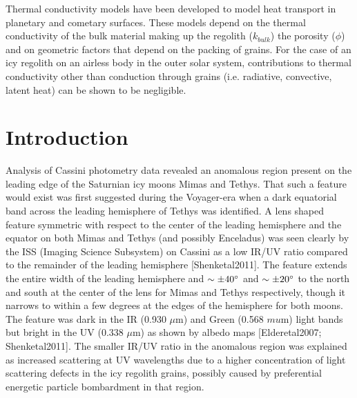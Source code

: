 \documentclass[11pt]{article} %
\begin{document}
	Thermal conductivity models have been developed to model heat transport in planetary and cometary surfaces. These models depend on the thermal conductivity of the bulk material making up the regolith ($k_{bulk}$) the porosity ($\phi$) and on geometric factors that depend on the packing of grains. For the case of an icy regolith on an airless body in the outer solar system, contributions to thermal conductivity other than conduction through grains (i.e. radiative, convective, latent heat) can be shown to be negligible.

\newpage
\section{Introduction}
\label{sec:intro}

	Analysis of Cassini photometry data revealed an anomalous region present on the leading edge of the Saturnian icy moons Mimas and Tethys. That such a feature would exist was first suggested during the Voyager-era when a dark equatorial band across the leading hemisphere of Tethys was identified. A lens shaped feature symmetric with respect to the center of the leading hemisphere and the equator on both Mimas and Tethys (and possibly Enceladus) was seen clearly by the ISS (Imaging Science Subsystem) on Cassini as a low IR/UV ratio compared to the remainder of the leading hemisphere [Shenketal2011]. The feature extends the entire width of the leading hemisphere and $\sim \pm40\degree$ and $\sim \pm20\degree$ to the north and south at the center of the lens for Mimas and Tethys respectively, though it narrows to within a few degrees at the edges of the hemisphere for both moons. The feature was dark in the IR (0.930 $\mu$m) and Green (0.568 $mu$m) light bands but bright in the UV (0.338 $\mu$m) as shown by albedo maps [Elderetal2007; Shenketal2011]. The smaller IR/UV ratio in the anomalous region was explained as increased scattering at UV wavelengths due to a higher concentration of light scattering defects in the icy regolith grains, possibly caused by preferential energetic particle bombardment in that region.
	
\end{document}
